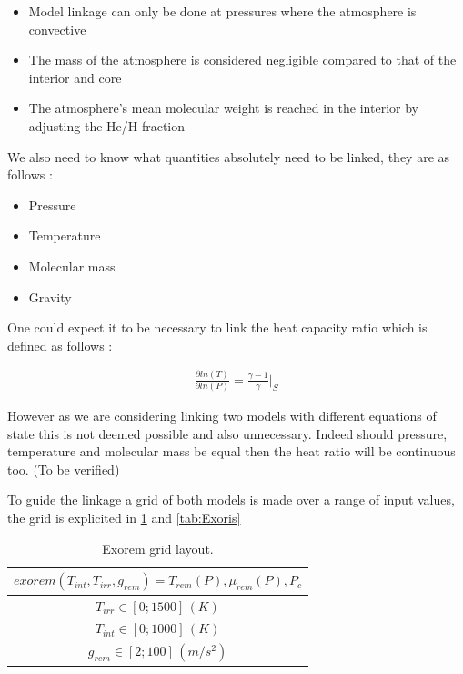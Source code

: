 \begin{itemize}
    \item Model linkage can only be done at pressures where the atmosphere is convective
    \item The mass of the atmosphere is considered negligible compared to that of the interior and core
    \item The atmosphere's mean molecular weight is reached in the interior by adjusting the He/H fraction
\end{itemize}

We also need to know what quantities absolutely need to be linked, they are as follows :

\begin{itemize}
    \item Pressure
    \item Temperature
    \item Molecular mass
    \item Gravity
\end{itemize}

One could expect it to be necessary to link the heat capacity ratio which is defined as follows :\par

\begin{align} 
    \frac{\partial ln(T)}{\partial ln(P)} = \frac{\gamma - 1}{\gamma} \Bigg|_{S} \label{eq:HC}
\end{align}

However as we are considering linking two models with different equations of state this is not deemed possible and also unnecessary. Indeed should pressure, temperature and molecular mass be equal then the heat ratio will be continuous too. (To be verified)\par

To guide the linkage a grid of both models is made over a range of input values, the grid is explicited in \cref{tab:Exorem} and \cref{tab:Exoris}

\begin{table}[htb]%
\centering
\caption{Exorem grid layout.}
	\label{tab:Exorem}
	\begin{tabular}{c}
		\toprule
		{$exorem(T_{int},T_{irr},g_{rem}) = T_{rem}(P), \mu_{rem}(P), P_c$}  \\
		\midrule
        \midrule
        $T_{irr} \in [0;1500] \, (K)$ \\
        \midrule
		$T_{int} \in [0;1000] \, (K)$   \\
        \midrule
		$g_{rem} \in [2;100] \, (m/s^2)$   \\
        \bottomrule
	\end{tabular}
\end{table}

